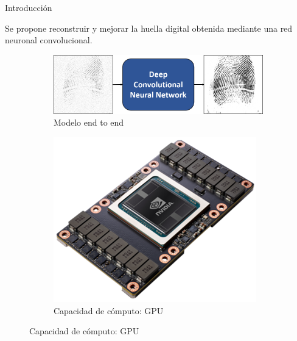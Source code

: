 \documentclass[12pt,aspectratio=169]{beamer}
\begin{document}
\begin{frame}{Introducción}

    Se propone reconstruir y mejorar la huella digital obtenida mediante una red neuronal convolucional.
    \vspace{3mm}

    \begin{figure}
        \begin{subfigure}{0.58\textwidth}
            \centering
            \includegraphics[scale=0.34]{figs/end_to_end.png}
            \caption{Modelo end to end}
        \end{subfigure}
        \begin{subfigure}{0.38\textwidth}
            \centering
            \includegraphics[scale=0.28]{figs/nvidia_card.png}
            \caption{Capacidad de cómputo: GPU}
        \end{subfigure}
    \end{figure}

\end{frame}
\end{document}
